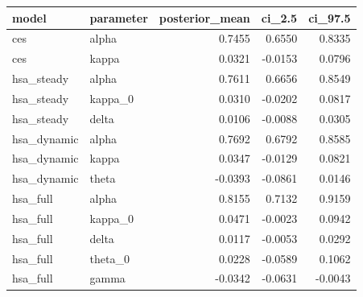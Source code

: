 \begin{tabular}{llrrr}
\toprule
model & parameter & posterior\_mean & ci\_2.5 & ci\_97.5 \\
\midrule
ces & alpha & 0.7455 & 0.6550 & 0.8335 \\
ces & kappa & 0.0321 & -0.0153 & 0.0796 \\
hsa\_steady & alpha & 0.7611 & 0.6656 & 0.8549 \\
hsa\_steady & kappa\_0 & 0.0310 & -0.0202 & 0.0817 \\
hsa\_steady & delta & 0.0106 & -0.0088 & 0.0305 \\
hsa\_dynamic & alpha & 0.7692 & 0.6792 & 0.8585 \\
hsa\_dynamic & kappa & 0.0347 & -0.0129 & 0.0821 \\
hsa\_dynamic & theta & -0.0393 & -0.0861 & 0.0146 \\
hsa\_full & alpha & 0.8155 & 0.7132 & 0.9159 \\
hsa\_full & kappa\_0 & 0.0471 & -0.0023 & 0.0942 \\
hsa\_full & delta & 0.0117 & -0.0053 & 0.0292 \\
hsa\_full & theta\_0 & 0.0228 & -0.0589 & 0.1062 \\
hsa\_full & gamma & -0.0342 & -0.0631 & -0.0043 \\
\bottomrule
\end{tabular}

